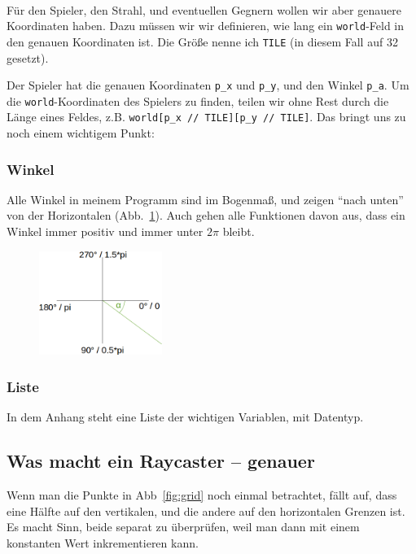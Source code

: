 \documentclass[a4paper,12pt]{report}
\begin{document}
\paragraph*{}
F\"ur den Spieler, den Strahl, und eventuellen Gegnern wollen wir aber genauere Koordinaten haben. Dazu m\"ussen wir wir definieren, wie lang ein \texttt{world}-Feld in den genauen Koordinaten ist. Die Gr\"o\ss e nenne ich \texttt{TILE} (in diesem Fall auf 32 gesetzt).

Der Spieler hat die genauen Koordinaten \texttt{p\_x} und \texttt{p\_y}, und den Winkel \texttt{p\_a}. Um die \texttt{world}-Koordinaten des Spielers zu finden, teilen wir ohne Rest durch die L\"ange eines Feldes, z.B. \texttt{world[p\_x // TILE][p\_y // TILE]}. Das bringt uns zu noch einem wichtigem Punkt:

\subsubsection{Winkel}
Alle Winkel in meinem Programm sind im Bogenma\ss , und zeigen ``nach unten'' von der Horizontalen (Abb.~\ref{fig:angles}). Auch gehen alle Funktionen davon aus, dass ein Winkel immer positiv und immer unter $2\pi$ bleibt.
\begin{figure}[htbp] 
        \centering
        \includegraphics[width=4cm]{angles.png} 
        \label{fig:angles}
\end{figure}

\subsubsection{Liste}
In dem Anhang steht eine Liste der wichtigen Variablen, mit Datentyp.

\subsection{Was macht ein Raycaster -- genauer}
Wenn man die Punkte in Abb~\ref{fig:grid} noch einmal betrachtet, f\"allt auf, dass eine H\"alfte auf den vertikalen, und die andere auf den horizontalen Grenzen ist. Es macht Sinn, beide separat zu \"uberpr\"ufen, weil man dann mit einem konstanten Wert inkrementieren kann.
\end{document}
